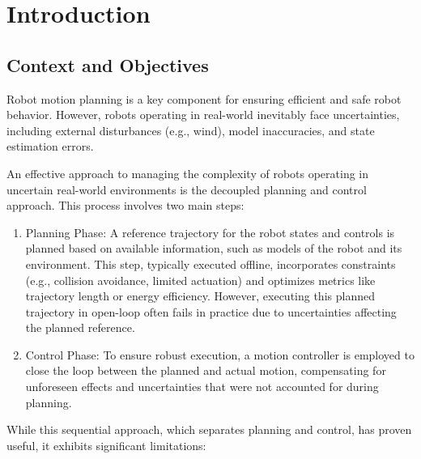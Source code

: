 \chapter{Introduction}

\section{Context and Objectives}

Robot motion planning is a key component for ensuring efficient and safe robot behavior.
However, robots operating in real-world inevitably face uncertainties, including external disturbances (e.g., wind), model inaccuracies, and state estimation errors.

An effective approach to managing the complexity of robots operating in uncertain real-world environments is the decoupled planning and control approach. 
This process involves two main steps:

\begin{enumerate}
  \item Planning Phase: A reference trajectory for the robot states and controls is planned based on available information, such as models of the robot and its environment.
  This step, typically executed offline, incorporates constraints (e.g., collision avoidance, limited actuation) and optimizes metrics like trajectory length or energy efficiency. 
  However, executing this planned trajectory in open-loop often fails in practice due to uncertainties affecting the planned reference.
  \item Control Phase: To ensure robust execution, a motion controller is employed to close the loop between the planned and actual motion, compensating for unforeseen effects and uncertainties that were not accounted for during planning.
\end{enumerate}
    
While this sequential approach, which separates planning and control, has proven useful, it exhibits significant limitations:

